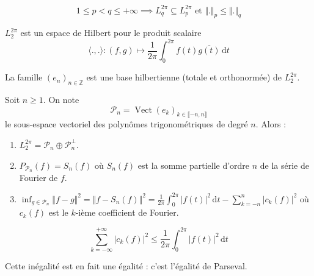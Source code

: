   \begin{remark}
    \[ 1 \leq p < q \leq +\infty \implies L_q^{2\pi} \subseteq L_p^{2\pi} \text{ et } \Vert . \Vert_p \leq \Vert . \Vert_q \]
  \end{remark}

  \begin{proposition}
    $L_2^{2\pi}$ est un espace de Hilbert pour le produit scalaire
    \[ \langle ., . \rangle : (f, g) \mapsto \frac{1}{2 \pi} \int_0^{2\pi} f(t) \overline{g(t)} \, \mathrm{d}t \]
  \end{proposition}


  \begin{theorem}
    La famille $(e_n)_{n \in \mathbb{Z}}$ est une base hilbertienne (totale et orthonormée) de $L_2^{2 \pi}$.
  \end{theorem}


  \begin{corollary}
    Soit $n \geq 1$. On note \[ \mathcal{P}_n = \operatorname{Vect}(e_k)_{k \in \llbracket -n, n \rrbracket} \]
    le sous-espace vectoriel des polynômes trigonométriques de degré $n$. Alors :
    \begin{enumerate}[label={\bfseries(\roman*)}]
      \item $L_2^{2\pi} = \mathcal{P}_n \oplus \mathcal{P}_n^\perp$.
      \item $P_{\mathcal{P}_n}(f) = S_n(f)$
      où $S_n(f)$ est la somme partielle d'ordre $n$ de la série de Fourier de $f$.
      \item $\inf_{g \in \mathcal{P}_n} \Vert f-g \Vert^2 = \Vert f-S_n(f) \Vert^2 = \frac{1}{2\pi} \int_0^{2\pi} \vert f(t) \vert^2 \, \mathrm{d}t - \sum_{k=-n}^{n} \vert c_k(f) \vert^2$
      où $c_k(f)$ est le $k$-ième coefficient de Fourier.
    \end{enumerate}
  \end{corollary}

  \begin{application}
    \[ \sum_{k=-\infty}^{+\infty} \vert c_k(f) \vert^2 \leq \frac{1}{2\pi} \int_0^{2\pi} \vert f(t) \vert^2 \, \mathrm{d}t \]
  \end{application}

  \begin{remark}
    Cette inégalité est en fait une égalité : c'est l'égalité de Parseval.
  \end{remark}

